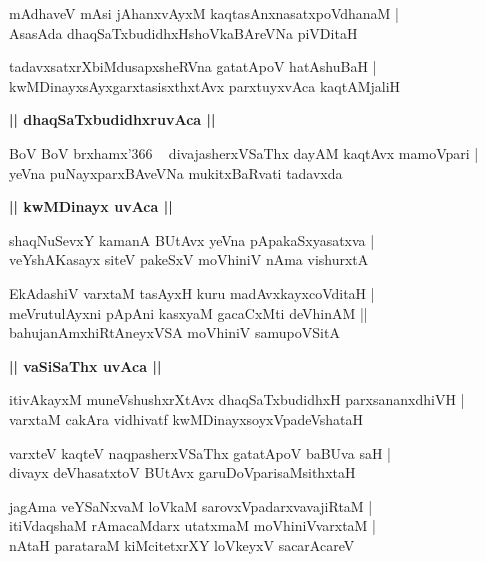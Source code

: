\documentclass[twoside,12pt,openright]{book}
\newcounter{shloka}[chapter]
\def\uvaca#1{\centerline{{\large\textbf{#1}}}}
\begin{document}
\begin{shloka}%
mAdhaveV mAsi jAhanxvAyxM kaqtasAnxnasatxpoVdhanaM |\\
AsasAda dhaqSaTxbudidhxHshoVkaBAreVNa piVDitaH
\end{shloka}

\begin{shloka}%
tadavxsatxrXbiMdusapxsheRVna gatatApoV hatAshuBaH |\\
kwMDinayxsAyxgarxtasisxthxtAvx parxtuyxvAca kaqtAMjaliH
\end{shloka}

\uvaca{|| dhaqSaTxbudidhxruvAca ||}

\begin{shloka}%
BoV BoV brxhamx\char'366 ~ divajasherxVSaThx dayAM kaqtAvx mamoVpari |\\
yeVna puNayxparxBAveVNa mukitxBaRvati tadavxda
\end{shloka}

\uvaca{|| kwMDinayx uvAca ||}

\begin{shloka}%
shaqNuSevxY kamanA BUtAvx yeVna pApakaSxyasatxva |\\
veYshAKasayx siteV pakeSxV moVhiniV nAma vishurxtA 
\end{shloka}

\begin{shloka}%
EkAdashiV varxtaM tasAyxH kuru madAvxkayxcoVditaH |\\
meVrutulAyxni pApAni kasxyaM gacaCxMti deVhinAM ||\\
bahujanAmxhiRtAneyxVSA moVhiniV samupoVSitA 
\end{shloka}

\uvaca{|| vaSiSaThx uvAca ||}

\begin{shloka}%
itivAkayxM muneVshushxrXtAvx dhaqSaTxbudidhxH parxsananxdhiVH |\\
varxtaM cakAra vidhivatf kwMDinayxsoyxVpadeVshataH
\end{shloka}

\begin{shloka}%
varxteV kaqteV naqpasherxVSaThx gatatApoV baBUva saH |\\
divayx deVhasatxtoV BUtAvx garuDoVparisaMsithxtaH 
\end{shloka}

\begin{shloka}%
jagAma veYSaNxvaM loVkaM sarovxVpadarxvavajiRtaM |\\
itiVdaqshaM rAmacaMdarx utatxmaM moVhiniVvarxtaM |\\
nAtaH parataraM kiMcitetxrXY loVkeyxV sacarAcareV
\end{shloka}
\end{document}
